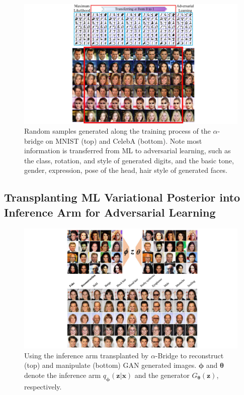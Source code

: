 \documentclass[letterpaper]{article} %
\newcommand{\xv}[0]{\ensuremath{\boldsymbol{x}} }
\newcommand{\zv}[0]{\ensuremath{\boldsymbol{z}} }
\newcommand{\thetav}[0]{\ensuremath{\boldsymbol{\theta}} }
\newcommand{\phiv}[0]{\ensuremath{\boldsymbol{\phi}} }
\begin{document}
\begin{figure}[tb]
	\centering
		\includegraphics[width=\columnwidth]{Figures/MNIST_CelebA_transfer.pdf}
		\caption{Random samples generated along the training process of the $\alpha$-bridge on MNIST (top) and CelebA (bottom).
			Note most information is transferred from ML to adversarial learning, such as the class, rotation, and style of generated digits, and the basic tone, gender, expression, pose of the head, hair style of generated faces.
		}
		\label{fig:Sample_MNIST_CelebA}
\end{figure}



\subsection{Transplanting ML Variational Posterior into Inference Arm for Adversarial Learning}



\begin{figure}[tb]
	\centering
		\includegraphics[width= \columnwidth]{Figures/Recon_Attribute_infer_CelebA.pdf}
		\caption{Using the inference arm transplanted by $\alpha$-Bridge to reconstruct (top) and manipulate (bottom) GAN generated images.
			$\phiv$ and $\thetav$ denote the inference arm $q_{\phiv}(\zv|\xv)$ and the generator $G_{\thetav}(\zv)$, respectively.
		}
		\label{fig:attribute_inference_arm}
\end{figure}
\end{document}
